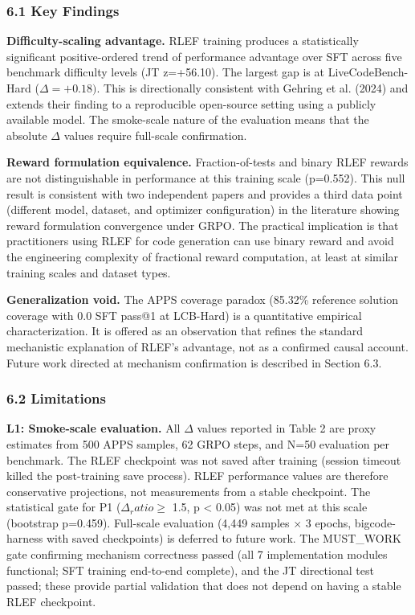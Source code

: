 
\subsubsection{6.1 Key Findings}

\textbf{Difficulty-scaling advantage.} RLEF training produces a statistically significant positive-ordered trend of performance advantage over SFT across five benchmark difficulty levels (JT z=+56.10). The largest gap is at LiveCodeBench-Hard ($\Delta =+0.18)$. This is directionally consistent with Gehring et al. (2024) and extends their finding to a reproducible open-source setting using a publicly available model. The smoke-scale nature of the evaluation means that the absolute $\Delta$ values require full-scale confirmation.

\textbf{Reward formulation equivalence.} Fraction-of-tests and binary RLEF rewards are not distinguishable in performance at this training scale (p=0.552). This null result is consistent with two independent papers and provides a third data point (different model, dataset, and optimizer configuration) in the literature showing reward formulation convergence under GRPO. The practical implication is that practitioners using RLEF for code generation can use binary reward and avoid the engineering complexity of fractional reward computation, at least at similar training scales and dataset types.

\textbf{Generalization void.} The APPS coverage paradox (85.32\% reference solution coverage with 0.0 SFT pass@1 at LCB-Hard) is a quantitative empirical characterization. It is offered as an observation that refines the standard mechanistic explanation of RLEF's advantage, not as a confirmed causal account. Future work directed at mechanism confirmation is described in Section 6.3.

\subsubsection{6.2 Limitations}

\textbf{L1: Smoke-scale evaluation.} All $\Delta$ values reported in Table 2 are proxy estimates from 500 APPS samples, 62 GRPO steps, and N=50 evaluation per benchmark. The RLEF checkpoint was not saved after training (session timeout killed the post-training save process). RLEF performance values are therefore conservative projections, not measurements from a stable checkpoint. The statistical gate for P1 ($\Delta _ratio \geq$ 1.5, p < 0.05) was not met at this scale (bootstrap p=0.459). Full-scale evaluation (4,449 samples $\times$ 3 epochs, bigcode-harness with saved checkpoints) is deferred to future work. The MUST\_WORK gate confirming mechanism correctness passed (all 7 implementation modules functional; SFT training end-to-end complete), and the JT directional test passed; these provide partial validation that does not depend on having a stable RLEF checkpoint.

